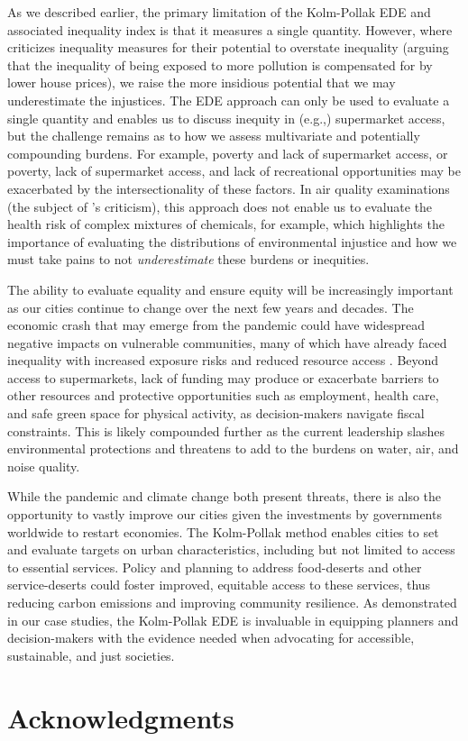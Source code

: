 \documentclass[final,3p,times,onecolumn,sort&compress]{elsarticle}
\begin{document}
As we described earlier, the primary limitation of the Kolm-Pollak EDE and associated inequality index is that it measures a single quantity.
However, where \cite{Cox2012-lg} criticizes inequality measures for their potential to overstate inequality (arguing that the inequality of being exposed to more pollution is compensated for by lower house prices), we raise the more insidious potential that we may underestimate the injustices.
The EDE approach can only be used to evaluate a single quantity and enables us to discuss inequity in (e.g.,) supermarket access, but the challenge remains as to how we assess multivariate and potentially compounding burdens.
For example, poverty and lack of supermarket access, or poverty, lack of supermarket access, and lack of recreational opportunities may be exacerbated by the intersectionality of these factors.
In air quality examinations (the subject of \cite{Cox2012-lg}'s criticism), this approach does not enable us to evaluate the health risk of complex mixtures of chemicals, for example, which highlights the importance of evaluating the distributions of environmental injustice and how we must take pains to not \textit{underestimate} these burdens or inequities.

The ability to evaluate equality and ensure equity will be increasingly important as our cities continue to change over the next few years and decades.
The economic crash that may emerge from the pandemic could have widespread negative impacts on vulnerable communities, many of which have already faced inequality with increased exposure risks \citep{patel2020-poverty} and reduced resource access \citep{power2020-covid}. 
Beyond access to supermarkets, lack of funding may produce or exacerbate barriers to other resources and protective opportunities such as employment, health care, and safe green space for physical activity, as decision-makers navigate fiscal constraints.
This is likely compounded further as the current leadership slashes environmental protections and threatens to add to the burdens on water, air, and noise quality.

While the pandemic and climate change both present threats, there is also the opportunity to vastly improve our cities given the investments by governments worldwide to restart economies.
The Kolm-Pollak method enables cities to set and evaluate targets on urban characteristics, including but not limited to access to essential services. 
Policy and planning to address food-deserts and other service-deserts could foster improved, equitable access to these services, thus reducing carbon emissions and improving community resilience.
As demonstrated in our case studies, the Kolm-Pollak EDE is invaluable in equipping planners and decision-makers with the evidence needed when advocating for accessible, sustainable, and just societies.

\section{Acknowledgments}


\end{document}
